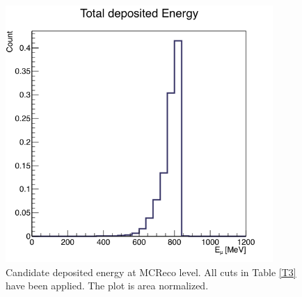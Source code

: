 \documentclass[a4paper, 10pt]{article}
\begin{document}
\begin{figure}[htbp]
\begin{center}
\includegraphics[width=4in]{pMuGamma/ProtonMCEn.png}
\caption{Candidate deposited energy at MCReco level. All cuts in Table \ref{T3} have been applied. The plot is area normalized.}
\label{F3}
\end{center}
\end{figure}
\end{document}
